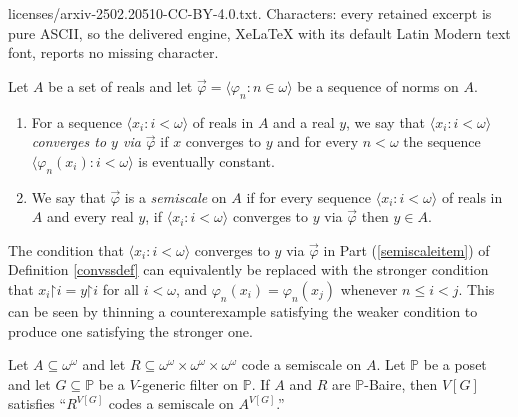 \documentclass[10pt,a4paper]{amsart}
\newcommand{\restrict}{\mathord{\restriction}}
\begin{document}
licenses/arxiv-2502.20510-CC-BY-4.0.txt. Characters: every retained excerpt is pure ASCII, so the delivered engine, XeLaTeX with its default Latin Modern text font, reports no missing character.
\begin{defn}\label{convssdef}
 Let $A$ be a set of reals and let $\vec{\varphi} = \langle \varphi_n : n \in \omega\rangle$ be a sequence of norms on $A$.
\begin{enumerate}
 \item For a sequence $\langle x_i : i < \omega \rangle$ of reals in $A$ and a real $y$,  we say that $\langle x_i : i < \omega\rangle$ \emph{converges to $y$ via $\vec{\varphi}$} if $x$ converges to $y$ and for every $n < \omega$ the sequence $\langle \varphi_n(x_i) : i < \omega\rangle$ is eventually constant.

 \item\label{semiscaleitem} We say that $\vec{\varphi}$ is a \emph{semiscale} on $A$ if
 for every sequence $\langle x_i : i < \omega\rangle$ of reals in $A$ and every real $y$, if $\langle x_i : i < \omega\rangle$ converges to $y$ via $\vec{\varphi}$ then $y \in A$. 
\end{enumerate}
\end{defn}

\begin{rem}\label{weakscalerem} The condition that $\langle x_{i} : i < \omega\rangle$ converges to $y$ via $\vec{\varphi}$ in Part (\ref{semiscaleitem}) of Definition \ref{convssdef} can equivalently be replaced with the stronger condition that $x_{i} \restrict i = y \restrict i$ for all $i < \omega$, and $\varphi_{n}(x_{i}) = \varphi_{n}(x_{j})$ whenever $n \leq i < j$. This can be seen by thinning a counterexample satisfying the weaker condition to produce one satisfying the stronger one. 
\end{rem}

\begin{lem}\label{expandscaleslemma}
  Let $A \subseteq \omega^\omega$ and let $R \subseteq \omega^\omega \times \omega^\omega \times \omega^\omega$ code a semiscale on $A$.
  Let $\mathbb{P}$ be a poset and let $G\subseteq \mathbb{P}$ be a $V$-generic filter on $\mathbb{P}$.
  If $A$ and $R$ are $\mathbb{P}$-Baire, then $V[G]$ satisfies ``$R^{V[G]}$ codes a semiscale on $A^{V[G]}$.''
\end{lem}
\end{document}
